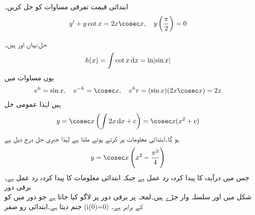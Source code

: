 
ابتدائی قیمت تفرقی مساوات کو حل کریں۔
\begin{align*}
y'+y\cot x=2x\cosec x,\quad y\left(\frac{\pi}{2}\right)=0
\end{align*}

حل:یہاں  اور  ہیں۔
\begin{align*}
h(x)=\int \cot x \dif x=\ln \abs{\sin x}
\end{align*}
یوں مساوات  میں
\begin{align*}
e^h=\sin x, \quad e^{-h}=\cosec x, \quad e^h r= (\sin x) (2x\cosec x)=2x
\end{align*}
ہیں لہٰذا عمومی حل
\begin{align*}
y=\cosec x \left(\int 2x\dif x +c\right)=\cosec x (x^2+c)
\end{align*}
ہو گا۔ابتدائی معلومات پر کرتے ہوئے   ملتا ہے لہٰذا جبری حل درج ذیل ہے
\begin{align*}
y=\cosec x \left(x^2-\frac{\pi^2}{4}\right)
\end{align*}
جس میں  درآیدہ کا پیدا کردہ رد عمل ہے جبکہ  ابتدائی معلومات کا پیدا کردہ رد عمل ہے۔
 \quad برقی دور\\
شکل  میں   اور   سلسلہ وار جڑے ہیں۔لمحہ  پر   برقی دور پر لاگو کیا جاتا ہے جو دور میں   کو جنم دیتا ہے۔ابتدائی رو صفر (i(0)=0) کے برابر ہے۔

